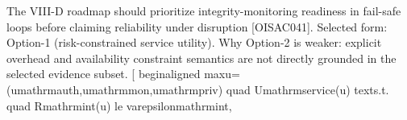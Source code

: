  The VIII-D roadmap should prioritize integrity-monitoring readiness in fail-safe loops before claiming reliability under disruption [O\markdownRendererUnderscore{}ISAC\markdownRendererUnderscore{}041].\markdownRendererOlItemEnd 
\markdownRendererOlEnd \markdownRendererInterblockSeparator
{}
\markdownRendererSectionEnd \markdownRendererSectionBegin
{}\markdownRendererInterblockSeparator
{}Selected form: Option-1 (risk-constrained service utility).\markdownRendererInterblockSeparator
{}\markdownRendererUlBeginTight
\markdownRendererUlItem Why Option-2 is weaker: explicit overhead and availability constraint semantics are not directly grounded in the selected evidence subset.\markdownRendererUlItemEnd 
\markdownRendererUlEndTight \markdownRendererInterblockSeparator
{}[\markdownRendererSoftLineBreak
{}\markdownRendererBackslash{}begin\markdownRendererLeftBrace{}aligned\markdownRendererRightBrace{}\markdownRendererSoftLineBreak
{}\markdownRendererBackslash{}max\markdownRendererUnderscore{}\markdownRendererLeftBrace{}u=(u\markdownRendererUnderscore{}\markdownRendererLeftBrace{}\markdownRendererBackslash{}mathrm\markdownRendererLeftBrace{}auth\markdownRendererRightBrace{}\markdownRendererRightBrace{},u\markdownRendererUnderscore{}\markdownRendererLeftBrace{}\markdownRendererBackslash{}mathrm\markdownRendererLeftBrace{}mon\markdownRendererRightBrace{}\markdownRendererRightBrace{},u\markdownRendererUnderscore{}\markdownRendererLeftBrace{}\markdownRendererBackslash{}mathrm\markdownRendererLeftBrace{}priv\markdownRendererRightBrace{}\markdownRendererRightBrace{})\markdownRendererRightBrace{} \markdownRendererBackslash{}quad \markdownRendererAmpersand{} U\markdownRendererUnderscore{}\markdownRendererLeftBrace{}\markdownRendererBackslash{}mathrm\markdownRendererLeftBrace{}service\markdownRendererRightBrace{}\markdownRendererRightBrace{}(u) \markdownRendererBackslash{}\markdownRendererSoftLineBreak
{}\markdownRendererBackslash{}text\markdownRendererLeftBrace{}s.t.\markdownRendererRightBrace{} \markdownRendererBackslash{}quad \markdownRendererAmpersand{} R\markdownRendererUnderscore{}\markdownRendererLeftBrace{}\markdownRendererBackslash{}mathrm\markdownRendererLeftBrace{}int\markdownRendererRightBrace{}\markdownRendererRightBrace{}(u) \markdownRendererBackslash{}le \markdownRendererBackslash{}varepsilon\markdownRendererUnderscore{}\markdownRendererLeftBrace{}\markdownRendererBackslash{}mathrm\markdownRendererLeftBrace{}int\markdownRendererRightBrace{}\markdownRendererRightBrace{}, \markdownRendererBackslash{}\markdownRendererSoftLineBreak
